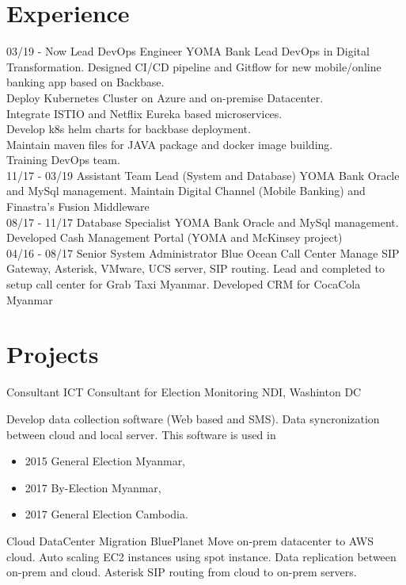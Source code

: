\documentclass[]{friggeri-cv}
\begin{document}
\section{Experience}
\begin{entrylist}
  \entry
    {03/19 - Now}
    {Lead DevOps Engineer}
    {YOMA Bank}
    {Lead DevOps in Digital Transformation. Designed CI/CD pipeline and Gitflow for new mobile/online banking app based on Backbase.\\Deploy Kubernetes Cluster on Azure and on-premise Datacenter.\\Integrate ISTIO and Netflix Eureka based microservices.\\Develop k8s helm charts for backbase deployment.\\Maintain maven files for JAVA package and docker image building.\\Training DevOps team.\\}
  \entry
    {11/17 - 03/19}
    {Assistant Team Lead (System and Database)}
    {YOMA Bank}
    {Oracle and MySql management. Maintain Digital Channel (Mobile Banking) and Finastra's Fusion Middleware\\
    }
  \entry
    {08/17 - 11/17}
    {Database Specialist}
    {YOMA Bank}
    {Oracle and MySql management. Developed Cash Management Portal (YOMA and McKinsey project)\\}
  \entry
    {04/16 - 08/17}
    {Senior System Administrator}
    {Blue Ocean Call Center}
    {Manage SIP Gateway, Asterisk, VMware, UCS server, SIP routing. Lead and completed to setup call center for Grab Taxi Myanmar. Developed CRM for CocaCola Myanmar\\ }
\end{entrylist}

\section{Projects}
\begin{entrylist}
	\entry
	{Consultant}
	{ICT Consultant for Election Monitoring}
	{NDI, Washinton DC}
	{Develop data collection software (Web based and SMS). Data syncronization between cloud and local server. This software is used in 
		\begin{itemize}
			\item 2015 General Election Myanmar,
			\item 2017 By-Election Myanmar,
			\item 2017 General Election Cambodia.
		\end{itemize}}
	\entry
	{Cloud}
	{DataCenter Migration}
	{BluePlanet}
	{Move on-prem datacenter to AWS cloud. Auto scaling EC2 instances using spot instance. Data replication between on-prem and cloud. Asterisk SIP routing from cloud to on-prem servers.\\}
\end{entrylist}
\end{document}
